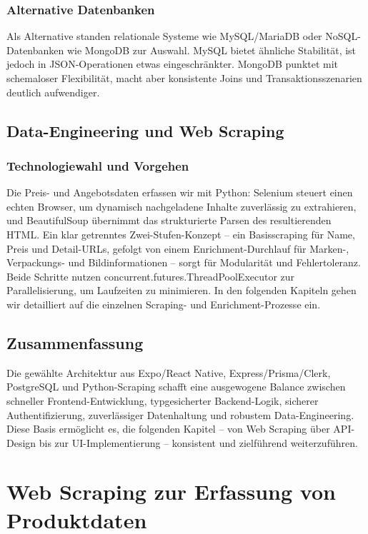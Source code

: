 \documentclass[12pt, a4paper]{report} %
\newcommand{\authorinitials}{} %
\begin{document}
\subsection{Alternative Datenbanken}
Als Alternative standen relationale Systeme wie MySQL/MariaDB oder NoSQL-Datenbanken wie MongoDB zur Auswahl. MySQL bietet ähnliche Stabilität, ist jedoch in JSON-Operationen etwas eingeschränkter. MongoDB punktet mit schemaloser Flexibilität, macht aber konsistente Joins und Transaktions­szenarien deutlich aufwendiger.

\section{Data-Engineering und Web Scraping}
\subsection{Technologiewahl und Vorgehen}
Die Preis- und Angebotsdaten erfassen wir mit Python: Selenium steuert einen echten Browser, um dynamisch nachgeladene Inhalte zuverlässig zu extrahieren, und BeautifulSoup übernimmt das strukturierte Parsen des resultierenden HTML. Ein klar getrenntes Zwei-Stufen-Konzept – ein Basisscraping für Name, Preis und Detail-URLs, gefolgt von einem Enrichment-Durchlauf für Marken-, Verpackungs- und Bildinformationen – sorgt für Modularität und Fehlertoleranz. Beide Schritte nutzen concurrent.futures.ThreadPoolExecutor zur Parallelisierung, um Laufzeiten zu minimieren. In den folgenden Kapiteln gehen wir detailliert auf die einzelnen Scraping- und Enrichment-Prozesse ein.

\section{Zusammenfassung}
Die gewählte Architektur aus Expo/React Native, Express/Prisma/Clerk, PostgreSQL und Python-Scraping schafft eine ausgewogene Balance zwischen schneller Frontend-Entwicklung, typgesicherter Backend-Logik, sicherer Authentifizierung, zuverlässiger Datenhaltung und robustem Data-Engineering. Diese Basis ermöglicht es, die folgenden Kapitel – von Web Scraping über API-Design bis zur UI-Implementierung – konsistent und zielführend weiterzuführen.

\chapter{Web Scraping zur Erfassung von Produktdaten}
\renewcommand{\authorinitials}{MK}
\label{chap:web_scraping}
\end{document}
